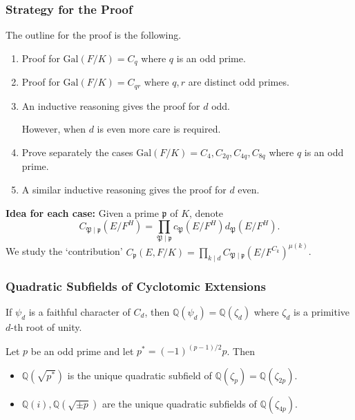 \documentclass{beamer}
\newcommand{\Gal}{\mathrm{Gal}}
\newcommand{\PP}{\mathfrak{P}}
\newcommand{\QQ}{\mathbb{Q}}
\newcommand{\pp}{\mathfrak{p}}
\theoremstyle{plain}
\begin{document}
\fi

\begin{frame}
    \frametitle{Strategy for the Proof}
    The outline for the proof is the following.
    \begin{enumerate}
        \item Proof for $\Gal(F/K)=C_{q}$ where $q$ is an odd prime. \pause
        \item Proof for $\Gal(F/K)=C_{qr}$ where $q,r$ are distinct odd primes. \pause
        \item An inductive reasoning gives the proof for $d$ odd. \pause
        \vspace{0.1cm}

        However, when $d$ is even more care is required.
        \item Prove separately the cases $\Gal(F/K)=C_4, C_{2q}, C_{4q}, C_{8q}$ where $q$ is an odd prime. \pause
        \item A similar inductive reasoning gives the proof for $d$ even. \pause
    \end{enumerate}
    \textbf{Idea for each case:} Given a prime $\pp$ of $K$, denote $$C_{\PP\mid\pp}(E/F^H)=\prod_{\PP\mid\pp}c_\PP(E/F^H)d_\PP(E/F^H).$$
    \pause We study the `contribution' $C_\pp(E,F/K)=\prod_{k\mid d}C_{\PP\mid\pp}(E/F^{C_k})^{\mu(k)}$.
\end{frame}

\begin{frame}
    \frametitle{Quadratic Subfields of Cyclotomic Extensions}
    If $\psi_d$ is a faithful character of $C_d$, then $\QQ(\psi_d)=\QQ(\zeta_d)$ where $\zeta_d$ is a primitive $d$-th root of unity. \pause

    \begin{lemma}
        Let $p$ be an odd prime and let $p^*=(-1)^{(p-1)/2}p$. \pause Then
        \begin{itemize}
            \item $\QQ(\sqrt{p^*})$ is the unique quadratic subfield of $\QQ(\zeta_{p})=\QQ(\zeta_{2p})$. \pause
            \item $\QQ(i), \QQ(\sqrt{\pm p})$ are the unique quadratic subfields of $\QQ(\zeta_{4p})$.
        \end{itemize}
    \end{lemma}
\end{frame}
\end{document}
